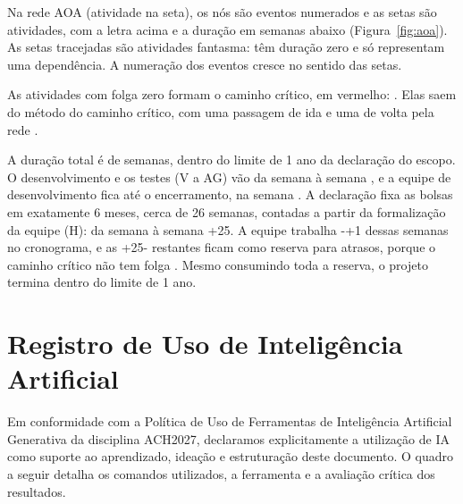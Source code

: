 \documentclass[a4paper]{article}
\begin{document}
{
Na rede AOA (atividade na seta), os nós são eventos numerados e as setas são atividades, com a letra acima e a duração em semanas abaixo (Figura~\ref{fig:aoa}). As setas tracejadas são atividades fantasma: têm duração zero e só representam uma dependência. A numeração dos eventos cresce no sentido das setas.

As atividades com folga zero formam o caminho crítico, em vermelho: \caminhoCritico. Elas saem do método do caminho crítico, com uma passagem de ida e uma de volta pela rede \cite{pmi2017}.

A duração total é de \duracaoTotal{} semanas, dentro do limite de 1 ano da declaração do escopo. O desenvolvimento e os testes (V a AG) vão da semana \inicioDesenvolvimento{} à semana \fimTestes{}, e a equipe de desenvolvimento fica até o encerramento, na semana \duracaoTotal{}. A declaração fixa as bolsas em exatamente 6 meses, cerca de 26 semanas, contadas a partir da formalização da equipe (H): da semana \inicioDesenvolvimento{} à semana \the\numexpr\inicioDesenvolvimento+25\relax. A equipe trabalha \the\numexpr\duracaoTotal-\inicioDesenvolvimento+1\relax{} dessas semanas no cronograma, e as \the\numexpr\inicioDesenvolvimento+25-\duracaoTotal\relax{} restantes ficam como reserva para atrasos, porque o caminho crítico não tem folga \cite{pmi2017}. Mesmo consumindo toda a reserva, o projeto termina dentro do limite de 1 ano.\par}

\section{Registro de Uso de Inteligência Artificial}

Em conformidade com a Política de Uso de Ferramentas de Inteligência Artificial Generativa da disciplina ACH2027, declaramos explicitamente a utilização de IA como suporte ao aprendizado, ideação e estruturação deste documento. O quadro a seguir detalha os comandos utilizados, a ferramenta e a avaliação crítica dos resultados.
\end{document}
